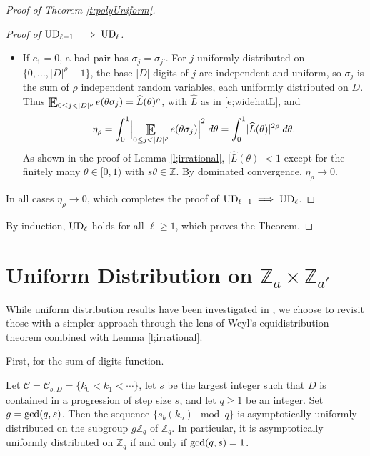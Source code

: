 \begin{proof}[Proof of Theorem \ref{t:polyUniform}]
\begin{proof}[Proof of $\textup{UD}_{\ell-1} \implies \textup{UD}_\ell$]
\begin{itemize}
\item If $c_1=0$, a bad pair has $\sigma_j=\sigma_{j'}$. 
For $j$ uniformly distributed on $\{0,\ldots,\lvert D\rvert^{\rho}-1\}$, the base $\lvert D\rvert$ digits of $j$ are independent and uniform, 
so $\sigma_j$ is the sum of $\rho$ independent random variables, each uniformly distributed on $D$. 
Thus $\Expectation_{0\leq j<\lvert D\rvert^{\rho}}e(\theta\sigma_j)=\widehat L(\theta)^{\rho}$, with $\widehat L$ as in \eqref{e;widehatL}, and 
\begin{equation}
\eta_\rho=\int_0^1\Bigl\lvert \Expectation_{0\leq j<\lvert D\rvert^{\rho}}e(\theta\sigma_j)\Bigr\rvert^2\;d\theta
=\int_0^1\lvert\widehat L(\theta)\rvert^{2\rho}\;d\theta. 
\end{equation}
As shown in the proof of Lemma \ref{l;irrational}, $\lvert\widehat L(\theta)\rvert<1$ except for the finitely many $\theta\in[0,1)$ with $s\theta\in\mathbb{Z}$. 
By dominated convergence, $\eta_\rho\to0$. 
\end{itemize}
In all cases $\eta_\rho\to0$, which completes the proof of $\textup{UD}_{\ell-1}\implies\textup{UD}_\ell$. 
\end{proof}

By induction, $\textup{UD}_\ell$ holds for all $\ell\geq1$, which proves the Theorem. 
\end{proof} 


\section{Uniform Distribution on \texorpdfstring{$\mathbb Z_a \times \mathbb Z_{a'}$}{Za x Za'}} \label{sec:modular}
While uniform distribution results have been investigated in \cite{SAAVEDRA-ARAYA_2026}, we choose to revisit those with a simpler approach through the lens of Weyl's equidistribution theorem combined with Lemma \ref{l;irrational}. 

First, for the sum of digits function.  

\begin{proposition}  \label{p;sumDigits}
Let $\mathcal{C} = \mathcal{C}_{b,D}=\{k_0<k_1<\cdots \}$, let $s$ be the largest integer such that $D$ is contained in a progression of step size $s$, 
and let $q\geq 1$ be an integer. Set $g=\textup{gcd}(q,s)$. 
Then the sequence 
$ \{s_b(k_n) \mod q\}$ is asymptotically uniformly distributed on the subgroup $g\mathbb{Z}_q$ of $\mathbb{Z} _{q}$. 
In particular, it is asymptotically uniformly distributed on $\mathbb{Z}_q$ if and only if $\textup{gcd}(q,s)=1$. 
\end{proposition}

